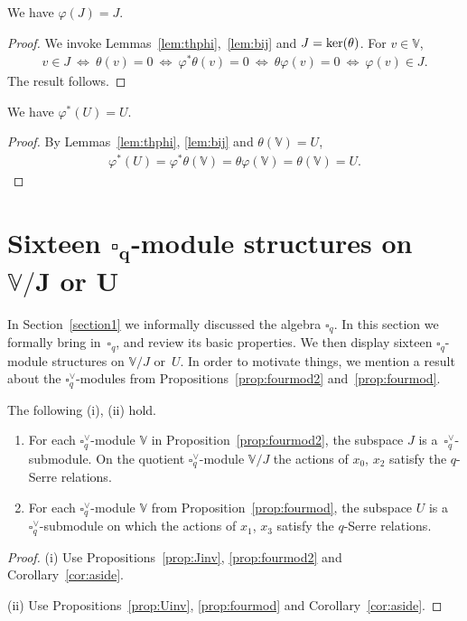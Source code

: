 \begin{Lemma}\label{lem:phiJU}We have $\varphi (J) = J$.
\end{Lemma}
\begin{proof} We invoke Lemmas~\ref{lem:thphi},~\ref{lem:bij} and $J={\rm ker}(\theta)$. For $v \in \mathbb V$,
\begin{gather*}
v \in J
\ \Leftrightarrow\
\theta(v) =0
\ \Leftrightarrow\
\varphi^* \theta(v) =0
\ \Leftrightarrow\
\theta \varphi(v) =0
\ \Leftrightarrow\
\varphi(v) \in J.
\end{gather*}
The result follows.
\end{proof}

\begin{Lemma}\label{lem:twoincl}We have $ \varphi^* (U) = U$.
\end{Lemma}
\begin{proof}By Lemmas~\ref{lem:thphi}, \ref{lem:bij} and $\theta(\mathbb V)=U$,
\begin{gather*}
\varphi^*(U) = \varphi^* \theta (\mathbb V) = \theta \varphi (\mathbb V)= \theta (\mathbb V) = U.\tag*{\qed}
\end{gather*}\renewcommand{\qed}{}
\end{proof}

\section[Sixteen $\square_q$-module structures on $\mathbb V/J$ or $U$]{Sixteen $\boldsymbol{\square_q}$-module structures on $\boldsymbol{\mathbb V/J}$ or $\boldsymbol{U}$}\label{section13}

In Section~\ref{section1} we informally discussed the algebra $\square_q$. In this section we formally bring in~$\square_q$, and review its basic properties. We then display sixteen $\square_q$-module structures on $\mathbb V/J$ or~$U$. In order to motivate things, we mention a result about the $\square^\vee_q$-modules from Propositions~\ref{prop:fourmod2} and~\ref{prop:fourmod}.

\begin{Lemma}\label{lem:alwaysUmod}
The following {\rm (i)}, {\rm (ii)} hold.
\begin{enumerate}\itemsep=0pt
\item[\rm (i)] For each $\square^\vee_q$-module $\mathbb V$ in Proposition~{\rm \ref{prop:fourmod2}},
 the subspace $J$ is a~$\square^\vee_q$-submodule. On the quotient $\square^\vee_q$-module $\mathbb V/J$
the actions of $x_0$, $x_2$ satisfy the $q$-Serre relations.
\item[\rm (ii)] For each $\square^\vee_q$-module $\mathbb V$ from Proposition~{\rm \ref{prop:fourmod}},
 the subspace $U$ is a~$\square^\vee_q$-submodule on which the actions of $x_1$, $x_3$ satisfy the $q$-Serre relations.
\end{enumerate}
\end{Lemma}
\begin{proof} (i) Use Propositions~\ref{prop:Jinv}, \ref{prop:fourmod2} and Corollary~\ref{cor:aside}.

 (ii) Use Propositions~\ref{prop:Uinv}, \ref{prop:fourmod} and Corollary~\ref{cor:aside}.
\end{proof}

